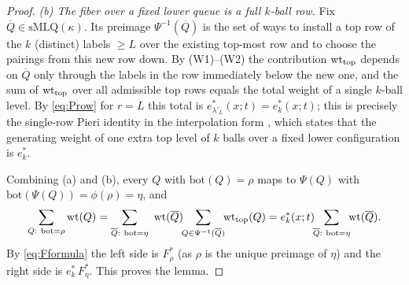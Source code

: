 \begin{proof}
\emph{(b) The fiber over a fixed lower queue is a full $k$-ball row.} Fix
$\overline Q\in\mathrm{sMLQ}(\kappa)$. Its preimage $\Psi^{-1}(\overline Q)$ is the
set of ways to install a top row of the $k$ (distinct) labels $\ge L$ over the
existing top-most row and to choose the pairings from this new row down. By
(W1)--(W2) the contribution $\operatorname{wt}_{\mathrm{top}}$ depends on $\overline Q$ only
through the labels in the row immediately below the new one, and the sum of
$\operatorname{wt}_{\mathrm{top}}$ over all admissible top rows equals the total weight of a
single $k$-ball level. By \eqref{eq:Prow} for $r=L$ this total is
$e^*_{\lambda'_L}(x;t)=e^*_k(x;t)$; this is precisely the single-row Pieri identity
\cite[Lem.~5.4]{AMW25} in the interpolation form \cite[Lem.~5.6]{BDW25a}, which
states that the generating weight of one extra top level of $k$ balls over a fixed
lower configuration is $e^*_k$.

Combining (a) and (b), every $Q$ with $\mathrm{bot}(Q)=\rho$ maps to $\Psi(Q)$ with
$\mathrm{bot}(\Psi(Q))=\phi(\rho)=\eta$, and
\[
\sum_{Q:\ \mathrm{bot}=\rho}\qthreewt(Q)
=\sum_{\overline Q:\ \mathrm{bot}=\eta}\ \qthreewt(\overline Q)\!\!\sum_{Q\in\Psi^{-1}(\overline Q)}\!\!\qthreewt_{\mathrm{top}}(Q)
=e^*_k(x;t)\!\!\sum_{\overline Q:\ \mathrm{bot}=\eta}\!\!\qthreewt(\overline Q).
\]
By \eqref{eq:Fformula} the left side is $F^*_\rho$ (as $\rho$ is the unique preimage
of $\eta$) and the right side is $e^*_k\,F^*_\eta$. This proves the lemma.
\end{proof}

